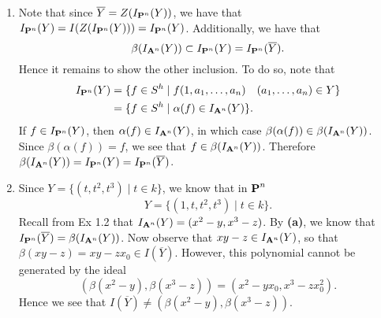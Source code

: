 \documentclass[10pt]{amsart}
\begin{document}
\begin{solution}
    \begin{luke}
        \begin{enumerate}
            \item 
            Note that since $\overline{Y} =  Z(I_{\pp^n}(Y))$, we have that 
            $I_{\pp^n}(Y) = I(Z(I_{\pp^n}(Y))) = I_{\pp^n}(Y)$. Additionally, we 
            have that 
            \[
                \beta(I_{\aa^n}(Y)) \subset I_{\pp^n}(Y) = I_{\pp^n}(\overline{Y}).
            \]
            Hence it remains to show the other inclusion. To do so, note that 
            \begin{align*}
                I_{\pp^n}(Y) 
                &= 
                \{f \in S^h \mid f(1, a_1, \dots, a_n) \quad (a_1, \dots, a_n) \in Y\}\\
                &=
                \{f \in S^h \mid \alpha(f) \in I_{\aa^n}(Y)  \}.
            \end{align*}
            If $f \in I_{\pp^n}(Y)$, then $\alpha(f) \in I_{\aa^n}(Y)$, in which 
            case $\beta(\alpha(f)) \in \beta(I_{\aa^n}(Y))$. Since $\beta(\alpha(f)) = f$, we see 
            that $f \in \beta(I_{\aa^n}(Y))$. Therefore $\beta(I_{\aa^n}(Y)) = I_{\pp^n}(Y) = I_{\pp^n}(\overline{Y})$.  
            
            \item Since $Y = \{(t, t^2, t^3) \mid t \in k\}$, we know that in $\pp^n$
            \[
                Y = \{ (1, t, t^2, t^3) \mid t \in k \}.
            \]
            Recall from Ex 1.2 that $I_{\aa^n}(Y) = (x^2 - y, x^3 - z)$. 
            By \textbf{(a)}, we know that $I_{\pp^n}(\overline{Y}) = \beta(I_{\aa^n}(Y))$.
            Now observe that $xy - z \in I_{\aa^n}(Y)$, so that $\beta(xy-z) = xy - zx_0 \in I(\overline{Y})$. 
            However, this polynomial cannot be generated by the ideal 
            \[
                (\beta(x^2 - y), \beta(x^3 - z)) = (x^2 - yx_0, x^3 - zx_0^2).  
            \]
            Hence we see that $I(\overline{Y}) \ne (\beta(x^2 - y), \beta(x^3 - z))$. 

        \end{enumerate}
    \end{luke}
\end{solution}
\end{document}

